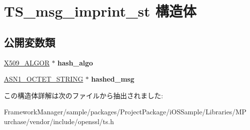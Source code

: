 \hypertarget{struct_t_s__msg__imprint__st}{}\section{T\+S\+\_\+msg\+\_\+imprint\+\_\+st 構造体}
\label{struct_t_s__msg__imprint__st}
\subsection*{公開変数類}
\begin{DoxyCompactItemize}
\item 
\hypertarget{struct_t_s__msg__imprint__st_aa0d4da96ba582b7b29ffe2acd192d10e}{}\hyperlink{struct_x509__algor__st}{X509\+\_\+\+A\+L\+G\+O\+R} $\ast$ {\bfseries hash\+\_\+algo}\label{struct_t_s__msg__imprint__st_aa0d4da96ba582b7b29ffe2acd192d10e}

\item 
\hypertarget{struct_t_s__msg__imprint__st_a0be6581788c745f9e1d872c47d511dad}{}\hyperlink{structasn1__string__st}{A\+S\+N1\+\_\+\+O\+C\+T\+E\+T\+\_\+\+S\+T\+R\+I\+N\+G} $\ast$ {\bfseries hashed\+\_\+msg}\label{struct_t_s__msg__imprint__st_a0be6581788c745f9e1d872c47d511dad}

\end{DoxyCompactItemize}


この構造体詳解は次のファイルから抽出されました\+:\begin{DoxyCompactItemize}
\item 
Framework\+Manager/sample/packages/\+Project\+Package/i\+O\+S\+Sample/\+Libraries/\+M\+Purchase/vendor/include/openssl/ts.\+h\end{DoxyCompactItemize}
